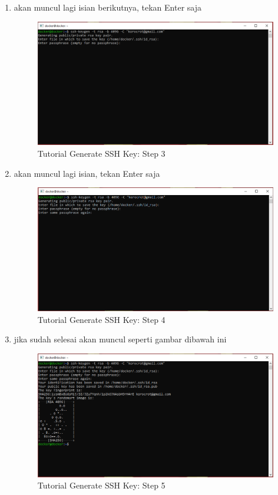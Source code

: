 \begin{enumerate}
\item akan muncul lagi isian berikutnya, tekan Enter saja
\begin{figure}[H]
        \centerline{\includegraphics[scale=0.5]{figures/generate-ssh-key/step3}}
        \caption{Tutorial Generate SSH Key: Step 3}
\end{figure}
\item akan muncul lagi isian, tekan Enter saja
\begin{figure}[H]
        \centerline{\includegraphics[scale=0.5]{figures/generate-ssh-key/step4}}
        \caption{Tutorial Generate SSH Key: Step 4}
\end{figure}
\item jika sudah selesai akan muncul seperti gambar dibawah ini
\begin{figure}[H]
        \centerline{\includegraphics[scale=0.5]{figures/generate-ssh-key/step5}}
        \caption{Tutorial Generate SSH Key: Step 5}
\end{figure}
\end{enumerate}


